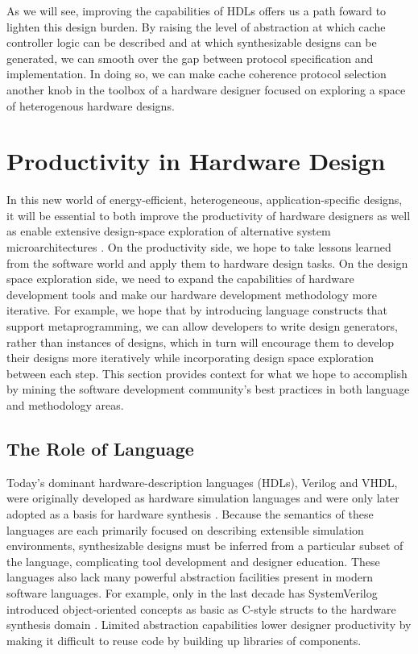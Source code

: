 As we will see, improving the capabilities of HDLs offers us a path foward to lighten this design burden.
By raising the level of abstraction at which cache controller logic can be described and at which synthesizable designs can be generated,
we can smooth over the gap between protocol specification and implementation.
In doing so, we can make cache coherence protocol selection another knob in the toolbox of a hardware designer focused on exploring a space of heterogenous hardware designs.

\section{Productivity in Hardware Design}

In this new world of energy-efficient, heterogeneous, application-specific designs, it will be essential to both improve the productivity of hardware designers as well as enable extensive design-space exploration of alternative system microarchitectures \cite{shacham-micro10}.
On the productivity side, we hope to take lessons learned from the software world and apply them to hardware design tasks.
On the design space exploration side, we need to expand the capabilities of hardware development tools and make our hardware development methodology more iterative.
For example, we hope that by introducing language constructs that support metaprogramming, 
we can allow developers to write design generators, rather than instances of designs,
which in turn will encourage them to develop their designs more iteratively while
incorporating design space exploration between each step.
This section provides context for what we hope to accomplish by mining the software development community's best practices in both language and methodology areas.

\subsection{The Role of Language}

Today's dominant hardware-description languages (HDLs), Verilog and VHDL, were originally developed as hardware simulation languages
and were only later adopted as a basis for hardware synthesis \cite{palnitkar2003verilog}.
Because the semantics of these languages are each primarily focused on describing extensible simulation environments,
synthesizable designs must be inferred from a particular subset of the language, complicating tool development and designer education. 
These languages also lack many powerful abstraction facilities present in modern software languages.
For example, only in the last decade has SystemVerilog introduced object-oriented concepts as basic as C-style structs to the hardware synthesis domain \cite{sutherland2006systemverilog}.
Limited abstraction capabilities lower designer productivity by making it difficult to reuse code by building up libraries of components.

